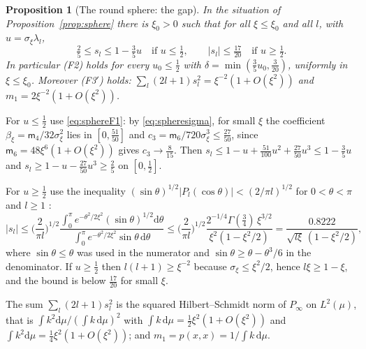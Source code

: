 \documentclass[11pt,a4paper]{article}
\makeatletter
\theoremstyle{stmt}
\newtheorem{proposition}[theorem]{Proposition}
\theoremstyle{defn}
\theoremstyle{rmk}
\renewenvironment{proof}[1][\proofname]{\par\pushQED{\qed}\normalfont\topsep6\p@\@plus6\p@\relax
  \trivlist\item[\hskip\labelsep{\sffamily\itshape\small #1.}]\ignorespaces}{\popQED\endtrivlist\@endpefalse}
\numberwithin{equation}{section}
\newcommand{\dd}{\mathrm{d}}
\makeatother
\begin{document}
{\begin{proposition}[The round sphere: the gap]\label{prop:spheregap}
In the situation of Proposition~\ref{prop:sphere} there is $\xi_0>0$ such that for all $\xi\le\xi_0$ and all $l$, with $u=\sigma_\xi\lambda_l$,
\[
\tfrac25\le s_l\le1-\tfrac35u\quad\text{if }u\le\tfrac12,\qquad|s_l|\le\tfrac{17}{20}\quad\text{if }u\ge\tfrac12 .
\]
In particular \textup{(F2)} holds for every $u_0\le\tfrac12$ with $\delta=\min(\tfrac35u_0,\tfrac3{20})$, uniformly in $\xi\le\xi_0$. Moreover \textup{(F3$'$)} holds: $\sum_l(2l+1)s_l^2=\xi^{-2}(1+O(\xi^2))$ and $m_1=2\xi^{-2}(1+O(\xi^2))$.
\end{proposition}

\begin{proof}
For $u\le\tfrac12$ use \eqref{eq:sphereF1}: by \eqref{eq:spheresigma}, for small $\xi$ the coefficient $\beta_\xi=\mathsf m_4/32\sigma_\xi^2$ lies in $[0,\tfrac{51}{50}]$ and $c_3=\mathsf m_6/720\sigma_\xi^3\le\tfrac{27}{50}$, since $\mathsf m_6=48\xi^6(1+O(\xi^2))$ gives $c_3\to\tfrac8{15}$. Then $s_l\le1-u+\tfrac{51}{100}u^2+\tfrac{27}{50}u^3\le1-\tfrac35u$ and $s_l\ge1-u-\tfrac{27}{50}u^3\ge\tfrac25$ on $[0,\tfrac12]$.

For $u\ge\tfrac12$ use the inequality $(\sin\theta)^{1/2}|P_l(\cos\theta)|<(2/\pi l)^{1/2}$ for $0<\theta<\pi$ and $l\ge1$ \cite[Section~7.3, inequality~(7.3.8)]{Szego}:
\[
|s_l|\le\Big(\frac{2}{\pi l}\Big)^{1/2}\frac{\int_0^\pi e^{-\theta^2/2\xi^2}(\sin\theta)^{1/2}\dd\theta}{\int_0^\pi e^{-\theta^2/2\xi^2}\sin\theta\,\dd\theta}\le\Big(\frac{2}{\pi l}\Big)^{1/2}\frac{2^{-1/4}\Gamma(\tfrac34)\,\xi^{3/2}}{\xi^2(1-\xi^2/2)}=\frac{0.8222}{\sqrt{l\xi}\,(1-\xi^2/2)},
\]
where $\sin\theta\le\theta$ was used in the numerator and $\sin\theta\ge\theta-\theta^3/6$ in the denominator. If $u\ge\tfrac12$ then $l(l+1)\ge\xi^{-2}$ because $\sigma_\xi\le\xi^2/2$, hence $l\xi\ge1-\xi$, and the bound is below $\tfrac{17}{20}$ for small $\xi$.

The sum $\sum_l(2l+1)s_l^2$ is the squared Hilbert--Schmidt norm of $P_\infty$ on $L^2(\mu)$, that is $\int k^2\dd\mu/(\int k\,\dd\mu)^2$ with $\int k\,\dd\mu=\tfrac12\xi^2(1+O(\xi^2))$ and $\int k^2\dd\mu=\tfrac14\xi^2(1+O(\xi^2))$; and $m_1=p(x,x)=1/\int k\,\dd\mu$.
\end{proof}

}
\end{document}
